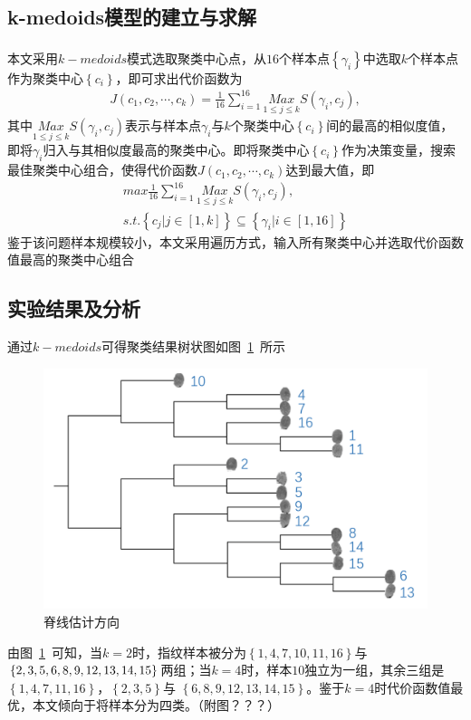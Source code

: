 \documentclass{whutmod}
\newcommand{\upcite}[1]{\textsuperscript{\cite{#1}}}
\begin{document}
  	\subsection{k-medoids模型的建立与求解}
  	本文采用$k-medoids$模式选取聚类中心点\upcite{14,15}，从$16$个样本点$\left \{ \gamma_i  \right \}$中选取$k$个样本点作为聚类中心$\left \{ c_i \right \}$，即可求出代价函数为
  	\begin{gather}
  J(c_1,c_2,\cdots,c_k)=\frac{1}{16}\sum _{i=1}^{16}\underset{1\leqslant j\leqslant k}{Max}S(\gamma _i,c_j),
  	\end{gather}
  	其中$\underset{1\leqslant j\leqslant k}{Max}S(\gamma _i,c_j)$表示与样本点$ \gamma_i $与$k$个聚类中心$\left \{ c_i \right \}$间的最高的相似度值，即将$\gamma _i$归入与其相似度最高的聚类中心。即将聚类中心$\left \{ c_i \right \}$作为决策变量，搜索最佳聚类中心组合，使得代价函数$J(c_1,c_2,\cdots,c_k)$达到最大值，即
      	\begin{gather}
      max \frac{1}{16}\sum _{i=1}^{16}\underset{1\leqslant j\leqslant k}{Max}S(\gamma _i,c_j),\\
      s.t.\left \{  c_j  | j\in [1,k] \right \}  \subseteq  \left \{ \gamma _i | i\in [1,16]\right \} 
      \end{gather}
  	鉴于该问题样本规模较小，本文采用遍历方式，输入所有聚类中心并选取代价函数值最高的聚类中心组合
  	\subsection{实验结果及分析}
  	通过$k-medoids$可得聚类结果树状图如图~\ref{bgbgbg}~所示
  	\begin{figure}[H]
  		\centering
  		\includegraphics[width=\textwidth]{figures/tree.png}
  		\caption{脊线估计方向}\label{bgbgbg}
  	\end{figure}
  	由图~\ref{bgbgbg}~可知，当$k=2$时，指纹样本被分为$\left \{ 1,4,7,10,11,16 \right \}$与$\left \{ 2,3,5,6,8,9,\\
  	12,13,14,15 \right \}$两组；当$k=4$时，样本$10$独立为一组，其余三组是$\left \{ 1,4,7,11,16 \right \}$，$\left \{ 2,3,5   \right \}$与 $\left \{ 6,8,9,12,13,14,15 \right \}$。鉴于$k=4$时代价函数值最优，本文倾向于将样本分为四类。（附图？？？）
  	
\end{document}
